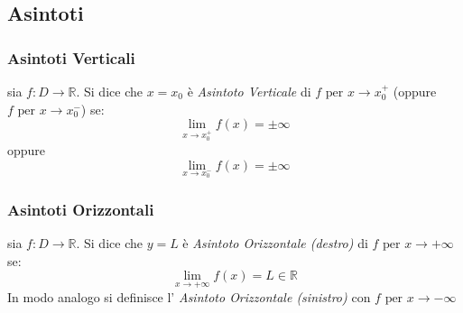 \documentclass[a4paper,12pt, oneside]{book}
\begin{document}
\subsection{Asintoti}
\subsubsection{Asintoti Verticali}
\begin{definizione}
sia $f:D \rightarrow \mathbb{R}$. Si dice che $x=x_0$ è \textit{Asintoto Verticale} di $f \mbox{ per } x\rightarrow x_0^{+}$ (oppure $f \mbox{ per } x\rightarrow x_0^{-}$) se:
$$\lim_{x\rightarrow x_0^{+}} f(x)= \pm \infty $$ oppure $$\lim_{x\rightarrow x_0^{-}} f(x)= \pm \infty $$
\end{definizione}
\subsubsection{Asintoti Orizzontali}
\begin{definizione}
sia $f:D \rightarrow \mathbb{R}$. Si dice che $y=L$ è \textit{Asintoto Orizzontale (destro)} di $f \mbox{ per } x\rightarrow + \infty$ se:
$$\lim_{x\rightarrow + \infty} f(x)= L\in \mathbb{R} $$
In modo analogo si definisce l' \textit{Asintoto Orizzontale (sinistro)} con $f \mbox{ per } x\rightarrow - \infty$ 
\end{definizione}
\newpage
\end{document}
